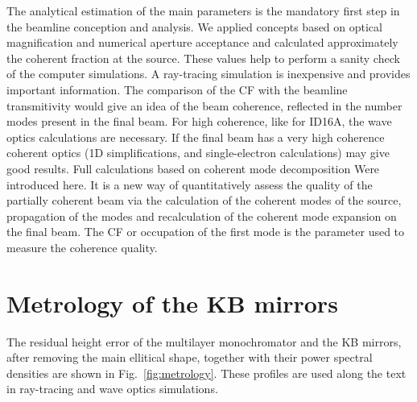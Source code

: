 \documentclass{iucr}              %
\newcommand{\todo}[1]{{\color{red}[TODO: "#1'']}}
\begin{document}
The analytical estimation of the main parameters is the mandatory first step in the beamline conception and analysis. We applied concepts based on optical magnification and numerical aperture acceptance and calculated approximately the coherent fraction at the source. These values help to perform a sanity check of the computer simulations. A ray-tracing simulation is inexpensive and provides important information. The comparison of the CF with the beamline transmitivity would give an idea of the beam coherence, reflected in the number modes present in the final beam. For high coherence, like for ID16A, the wave optics calculations are necessary. If the final beam has a very high coherence coherent optics (1D simplifications, and single-electron calculations) may give good results. Full calculations based on coherent mode decomposition Were introduced here. It is a new way of quantitatively assess the quality of the partially coherent beam via the calculation of the coherent modes of the source, propagation of the modes and recalculation of the coherent mode expansion on the final beam. The CF or occupation of the first mode is the parameter used to measure the coherence quality. 


% 


\appendix

\section{Metrology of the KB mirrors}
\label{appendix:metrology}
The residual height error of the multilayer monochromator and the KB mirrors, after removing the main ellitical shape, together with their power spectral densities are shown in Fig.~\ref{fig:metrology}. These profiles are used along the text in ray-tracing and wave optics simulations.
\end{document}
